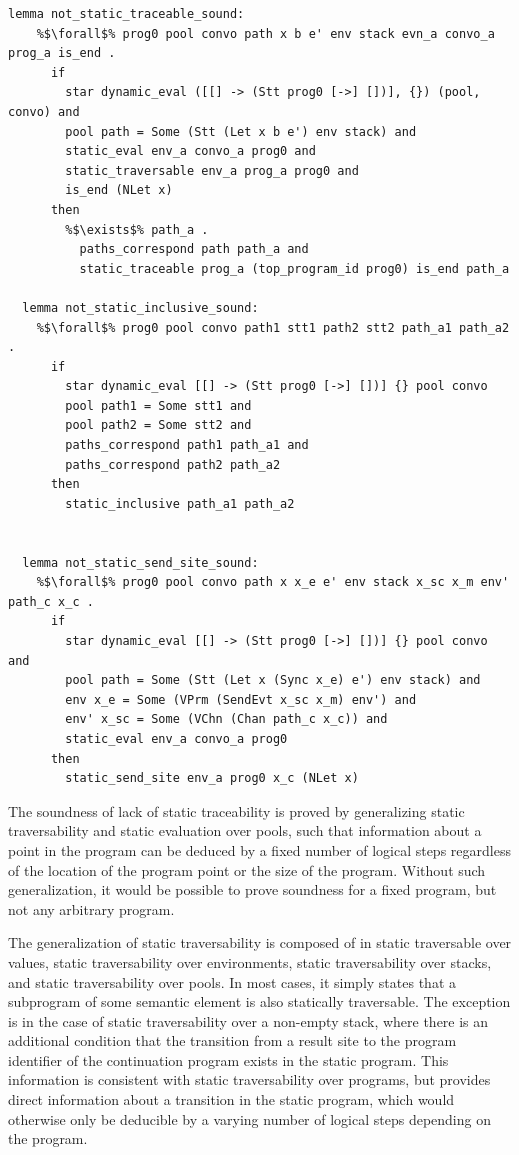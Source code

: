 \documentclass{article}
\begin{document}
\begin{lstlisting}[language=logic, escapechar=\%]
  lemma not_static_traceable_sound:
    %$\forall$% prog0 pool convo path x b e' env stack evn_a convo_a prog_a is_end .
      if
        star dynamic_eval ([[] -> (Stt prog0 [->] [])], {}) (pool, convo) and 
        pool path = Some (Stt (Let x b e') env stack) and 
        static_eval env_a convo_a prog0 and 
        static_traversable env_a prog_a prog0 and 
        is_end (NLet x)
      then
        %$\exists$% path_a . 
          paths_correspond path path_a and 
          static_traceable prog_a (top_program_id prog0) is_end path_a

  lemma not_static_inclusive_sound:
    %$\forall$% prog0 pool convo path1 stt1 path2 stt2 path_a1 path_a2 . 
      if
        star dynamic_eval [[] -> (Stt prog0 [->] [])] {} pool convo
        pool path1 = Some stt1 and 
        pool path2 = Some stt2 and 
        paths_correspond path1 path_a1 and 
        paths_correspond path2 path_a2
      then
        static_inclusive path_a1 path_a2


  lemma not_static_send_site_sound:
    %$\forall$% prog0 pool convo path x x_e e' env stack x_sc x_m env' path_c x_c .
      if
        star dynamic_eval [[] -> (Stt prog0 [->] [])] {} pool convo and 
        pool path = Some (Stt (Let x (Sync x_e) e') env stack) and 
        env x_e = Some (VPrm (SendEvt x_sc x_m) env') and 
        env' x_sc = Some (VChn (Chan path_c x_c)) and 
        static_eval env_a convo_a prog0
      then 
        static_send_site env_a prog0 x_c (NLet x)
\end{lstlisting}

The soundness of lack of static traceability is proved by generalizing
static traversability and static evaluation over pools, such that information about a point in
the program can be deduced by a fixed number of logical steps regardless of the location of the
program point or the size of the program. Without such generalization, it would be possible to
prove soundness for a fixed program, but not any arbitrary program.

The generalization of static traversability is composed of in static traversable over values,
static traversability over environments, static traversability over stacks, and static
traversability over pools.
In most cases, it simply states that a subprogram of some semantic element is also statically
traversable. The exception is in the case of
static traversability over a non-empty stack, where
there is an additional condition that the transition
from a result site to the program identifier
of the continuation program exists in the static program.
This information is consistent with static
traversability over programs, but provides direct information about a transition in the
static program, which would otherwise only be deducible by a varying number of logical steps
depending on the program.
\end{document}
